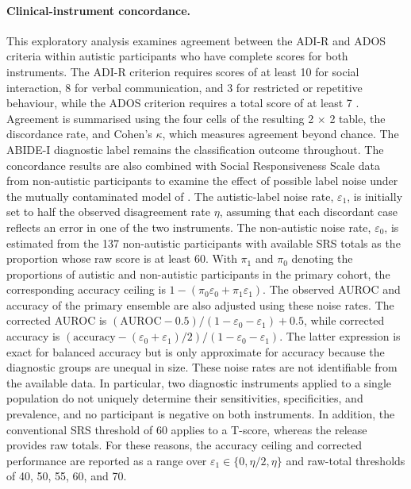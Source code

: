 \paragraph{\textbf{Clinical-instrument concordance.}}
\label{par:instrument-concordance}
This exploratory analysis examines agreement between the ADI-R and ADOS criteria within autistic participants who have complete scores for both instruments. The ADI-R criterion requires scores of at least 10 for social interaction, 8 for verbal communication, and 3 for restricted or repetitive behaviour, while the ADOS criterion requires a total score of at least 7 \citep{Lordetal1994,Lordetal2000}. Agreement is summarised using the four cells of the resulting 2 $\times$ 2 table, the discordance rate, and Cohen's $\kappa$, which measures agreement beyond chance. The ABIDE-I diagnostic label remains the classification outcome throughout. The concordance results are also combined with Social Responsiveness Scale data from non-autistic participants to examine the effect of possible label noise under the mutually contaminated model of \citet{Menonetal2015}. The autistic-label noise rate, $\varepsilon_1$, is initially set to half the observed disagreement rate $\eta$, assuming that each discordant case reflects an error in one of the two instruments. The non-autistic noise rate, $\varepsilon_0$, is estimated from the 137 non-autistic participants with available SRS totals as the proportion whose raw score is at least 60. With $\pi_1$ and $\pi_0$ denoting the proportions of autistic and non-autistic participants in the primary cohort, the corresponding accuracy ceiling is $1-(\pi_0\varepsilon_0+\pi_1\varepsilon_1)$. The observed AUROC and accuracy of the primary ensemble are also adjusted using these noise rates. The corrected AUROC is $(\mathrm{AUROC}-0.5)/(1-\varepsilon_0-\varepsilon_1)+0.5$, while corrected accuracy is $(\mathrm{accuracy}-(\varepsilon_0+\varepsilon_1)/2)/(1-\varepsilon_0-\varepsilon_1)$. The latter expression is exact for balanced accuracy but is only approximate for accuracy because the diagnostic groups are unequal in size. These noise rates are not identifiable from the available data. In particular, two diagnostic instruments applied to a single population do not uniquely determine their sensitivities, specificities, and prevalence, and no participant is negative on both instruments. In addition, the conventional SRS threshold of 60 applies to a T-score, whereas the release provides raw totals. For these reasons, the accuracy ceiling and corrected performance are reported as a range over $\varepsilon_1\in\{0,\eta/2,\eta\}$ and raw-total thresholds of 40, 50, 55, 60, and 70.


